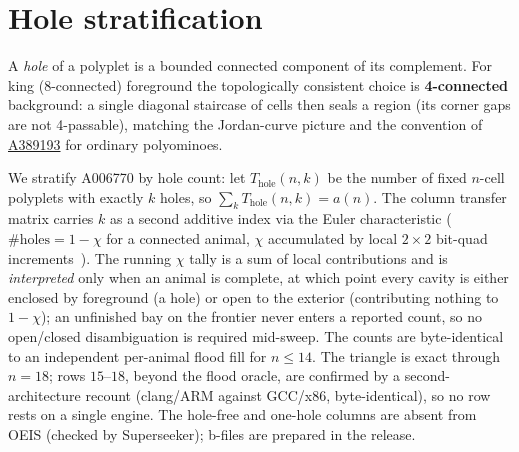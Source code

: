 \documentclass[11pt]{article}
\begin{document}
\section{Hole stratification}
\label{sec:holes}

A \emph{hole} of a polyplet is a bounded connected component of its
complement. For king (8-connected) foreground the topologically consistent
choice is \textbf{4-connected} background: a single diagonal staircase of
cells then seals a region (its corner gaps are not 4-passable), matching the
Jordan-curve picture and the convention of
\href{https://oeis.org/A389193}{A389193} for ordinary polyominoes.

We stratify A006770 by hole count: let $T_{\mathrm{hole}}(n,k)$ be the number
of fixed $n$-cell polyplets with exactly $k$ holes, so
$\sum_k T_{\mathrm{hole}}(n,k)=a(n)$. The column transfer matrix carries $k$
as a second additive index via the Euler characteristic
($\#\text{holes}=1-\chi$ for a connected animal, $\chi$ accumulated by local
$2\times2$ bit-quad increments~\cite{gray}). The running $\chi$ tally is a
sum of local contributions and is \emph{interpreted} only when an animal is
complete, at which point every cavity is either enclosed by foreground (a
hole) or open to the exterior (contributing nothing to $1-\chi$); an
unfinished bay on the frontier never enters a reported count, so no
open/closed disambiguation is required mid-sweep. The counts are
byte-identical to an independent per-animal flood fill for $n\le14$.
The triangle is exact through $n=18$; rows
$15$--$18$, beyond the flood oracle, are confirmed by a second-architecture
recount (clang/ARM against GCC/x86, byte-identical), so no row rests on a
single engine. The
hole-free and one-hole columns are absent from OEIS (checked by Superseeker);
b-files are prepared in the release.
\end{document}
